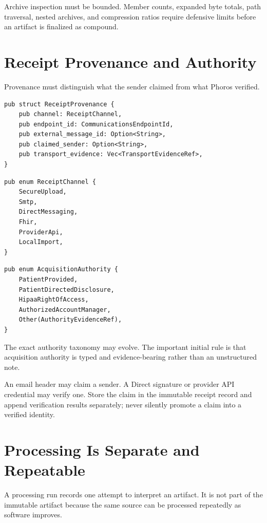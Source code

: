 \documentclass[11pt]{article}
\begin{document}
Archive inspection must be bounded. Member counts, expanded byte totals, path traversal, nested archives, and compression ratios require defensive limits before an artifact is finalized as compound.

\section{Receipt Provenance and Authority}

Provenance must distinguish what the sender claimed from what Phoros verified.

\begin{lstlisting}
pub struct ReceiptProvenance {
    pub channel: ReceiptChannel,
    pub endpoint_id: CommunicationsEndpointId,
    pub external_message_id: Option<String>,
    pub claimed_sender: Option<String>,
    pub transport_evidence: Vec<TransportEvidenceRef>,
}
\end{lstlisting}

\Needspace{0.20\textheight}
\begin{lstlisting}
pub enum ReceiptChannel {
    SecureUpload,
    Smtp,
    DirectMessaging,
    Fhir,
    ProviderApi,
    LocalImport,
}
\end{lstlisting}

\Needspace{0.22\textheight}
\begin{lstlisting}
pub enum AcquisitionAuthority {
    PatientProvided,
    PatientDirectedDisclosure,
    HipaaRightOfAccess,
    AuthorizedAccountManager,
    Other(AuthorityEvidenceRef),
}
\end{lstlisting}

The exact authority taxonomy may evolve. The important initial rule is that acquisition authority is typed and evidence-bearing rather than an unstructured note.

\begin{decisionbox}
An email header may claim a sender. A Direct signature or provider API credential may verify one. Store the claim in the immutable receipt record and append verification results separately; never silently promote a claim into a verified identity.
\end{decisionbox}

\Needspace{0.55\textheight}
\section{Processing Is Separate and Repeatable}

A processing run records one attempt to interpret an artifact. It is not part of the immutable artifact because the same source can be processed repeatedly as software improves.
\end{document}
